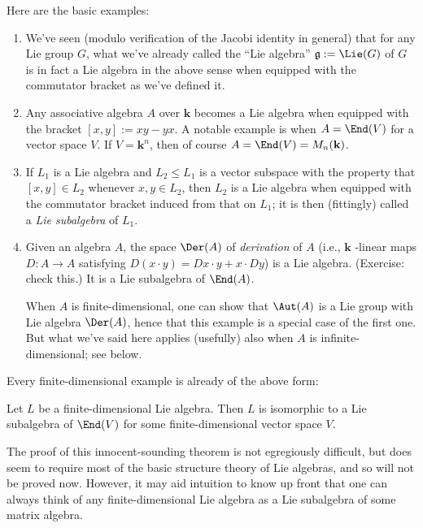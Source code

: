 \documentclass[reqno]{amsart} 
\begin{document}
Here are the basic examples:
\begin{enumerate}
\item We've seen (modulo verification
  of the Jacobi identity in general)
  that for any Lie group $G$,
  what we've already called the ``Lie algebra''
  $\mathfrak{g} := \Lie(G)$ of $G$ is in fact
  a Lie algebra in the above sense
  when equipped with the commutator bracket as we've defined it.
\item Any associative algebra $A$ over $\mathbf{k}$
  becomes a Lie algebra when equipped with the bracket
  $[x,y] := x y - y x$.
  A notable example is when $A = \End(V)$ for a vector space
  $V$.
  If $V = \mathbf{k}^n$, then of course $A = \End(V) =
  M_n(\mathbf{k})$.
\item If $L_1$ is a Lie algebra
  and $L_2 \leq L_1$ is a vector subspace
  with the property that $[x,y] \in L_2$ whenever $x,y \in L_2$,
  then $L_2$ is a Lie algebra when equipped with the commutator
  bracket induced from that on $L_1$;
  it is then (fittingly) called a \emph{Lie subalgebra}
  of $L_1$.
\item Given an algebra $A$,
  the
  space $\Der(A)$
  of
  \emph{derivation} of $A$
  (i.e., $\mathbf{k}$ -linear maps $D  : A \rightarrow A$
  satisfying $D(x \cdot y) = D x \cdot y + x \cdot D y$)
  is a Lie algebra.
  (Exercise: check this.)
  It is a Lie subalgebra of $\End(A)$.

  When $A$ is finite-dimensional,
  one can show that $\Aut(A)$ is a Lie group with Lie algebra
  $\Der(A)$,
  hence that this example is a special case of the first one.
  But what we've said here applies (usefully) also
  when $A$ is infinite-dimensional; see below.
\end{enumerate}

Every finite-dimensional example is already of the above form:
\begin{theorem}
[Ado]
  Let $L$ be a finite-dimensional Lie algebra.
  Then $L$ is isomorphic to a Lie subalgebra of $\End(V)$
  for some finite-dimensional vector space $V$.
\end{theorem}
The proof of this innocent-sounding theorem is not egregiously
difficult, but does seem to require most of the basic structure
theory of Lie algebras, and so will not be proved now.
However, it may aid intuition to know up front
that one can always think of any finite-dimensional Lie algebra
as a Lie subalgebra of some matrix algebra.
\end{document}
